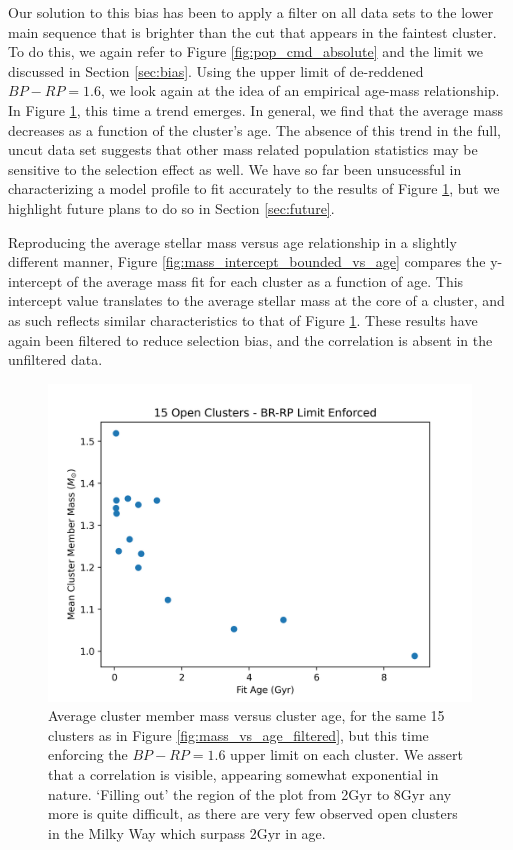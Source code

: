 \documentclass[onecolumn,table,xcdraw,super]{aastex631}
\begin{document}
Our solution to this bias has been to apply a filter on all data sets to the lower main sequence that is brighter than the cut that appears in the faintest cluster. To do this, we again refer to Figure \ref{fig:pop_cmd_absolute} and the limit we discussed in Section \ref{sec:bias}. Using the upper limit of de-reddened $BP-RP = 1.6$, we look again at the idea of an empirical age-mass relationship. In Figure \ref{fig:mass_vs_age_bounded}, this time a trend emerges. In general, we find that the average mass decreases as a function of the cluster's age. The absence of this trend in the full, uncut data set suggests that other mass related population statistics may be sensitive to the selection effect as well. We have so far been unsucessful in characterizing a model profile to fit accurately to the results of Figure \ref{fig:mass_vs_age_bounded}, but we highlight future plans to do so in Section \ref{sec:future}.

Reproducing the average stellar mass versus age relationship in a slightly different manner, Figure \ref{fig:mass_intercept_bounded_vs_age} compares the y-intercept of the average mass fit for each cluster as a function of age. This intercept value translates to the average stellar mass at the core of a cluster, and as such reflects similar characteristics to that of Figure \ref{fig:mass_vs_age_bounded}. These results have again been filtered to reduce selection bias, and the correlation is absent in the unfiltered data.

\begin{figure}[]
    \centering
      \includegraphics[width=4.75in]{figures/mass_vs_age_bounded.png}
    \caption{Average cluster member mass versus cluster age, for the same 15 clusters as in Figure \ref{fig:mass_vs_age_filtered}, but this time enforcing the $BP-RP = 1.6$ upper limit on each cluster. We assert that a correlation is visible, appearing somewhat exponential in nature. `Filling out' the region of the plot from 2Gyr to 8Gyr any more is quite difficult, as there are very few observed open clusters in the Milky Way which surpass 2Gyr in age.}
    \label{fig:mass_vs_age_bounded}
\end{figure}
\end{document}
